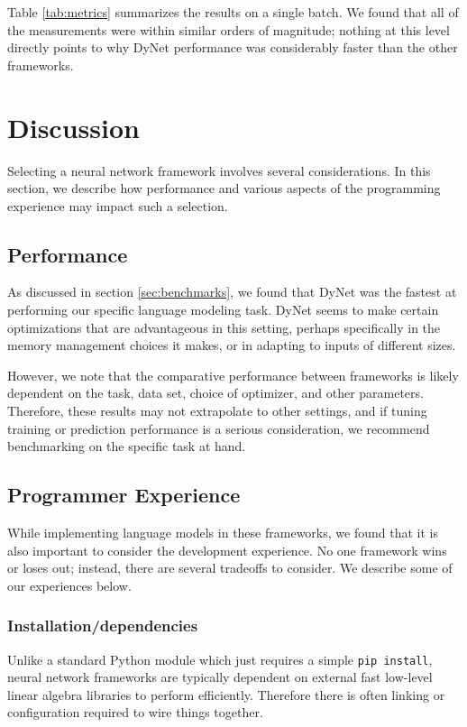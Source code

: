 \documentclass{article}
\begin{document}
Table \ref{tab:metrics} summarizes the results on a single batch. We found that all of the measurements were within similar orders of magnitude; nothing at this level directly points to why DyNet performance was considerably faster than the other frameworks.

\section{Discussion}

Selecting a neural network framework involves several considerations. In this section, we describe how performance and various aspects of the programming experience may impact such a selection.

\subsection{Performance}

As discussed in section \ref{sec:benchmarks}, we found that DyNet was the fastest at performing our specific language modeling task.
DyNet seems to make certain optimizations that are advantageous in this setting, perhaps specifically in the memory management choices it makes, or in adapting to inputs of different sizes.

However, we note that the comparative performance between frameworks is likely dependent on the task, data set, choice of optimizer, and other parameters. Therefore, these results may not extrapolate to other settings, and if tuning training or prediction performance is a serious consideration, we recommend benchmarking on the specific task at hand.

\subsection{Programmer Experience}

While implementing language models in these frameworks, we found that it is also important to consider the development experience. No one framework wins or loses out; instead, there are several tradeoffs to consider. We describe some of our experiences below.

\subsubsection{Installation/dependencies}

Unlike a standard Python module which just requires a simple \texttt{pip install}, neural network frameworks are typically dependent on external fast low-level linear algebra libraries to perform efficiently. Therefore there is often linking or configuration required to wire things together.
\end{document}
